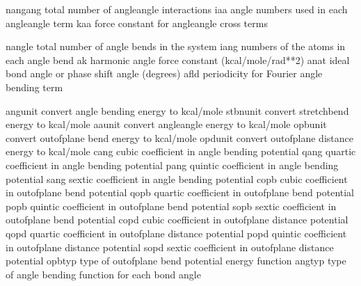 \documentclass[letterpaper,11pt,english]{sphinxmanual}
\begin{document}

\begin{sphinxVerbatim}[commandchars=\\\{\}]
nangang         total number of angle\PYGZhy{}angle interactions
iaa             angle numbers used in each angle\PYGZhy{}angle term
kaa             force constant for angle\PYGZhy{}angle cross terms
\end{sphinxVerbatim}


\begin{sphinxVerbatim}[commandchars=\\\{\}]
nangle          total number of angle bends in the system
iang            numbers of the atoms in each angle bend
ak              harmonic angle force constant (kcal/mole/rad**2)
anat            ideal bond angle or phase shift angle (degrees)
afld            periodicity for Fourier angle bending term
\end{sphinxVerbatim}


\begin{sphinxVerbatim}[commandchars=\\\{\}]
angunit         convert angle bending energy to kcal/mole
stbnunit        convert stretch\PYGZhy{}bend energy to kcal/mole
aaunit          convert angle\PYGZhy{}angle energy to kcal/mole
opbunit         convert out\PYGZhy{}of\PYGZhy{}plane bend energy to kcal/mole
opdunit         convert out\PYGZhy{}of\PYGZhy{}plane distance energy to kcal/mole
cang            cubic coefficient in angle bending potential
qang            quartic coefficient in angle bending potential
pang            quintic coefficient in angle bending potential
sang            sextic coefficient in angle bending potential
copb            cubic coefficient in out\PYGZhy{}of\PYGZhy{}plane bend potential
qopb            quartic coefficient in out\PYGZhy{}of\PYGZhy{}plane bend potential
popb            quintic coefficient in out\PYGZhy{}of\PYGZhy{}plane bend potential
sopb            sextic coefficient in out\PYGZhy{}of\PYGZhy{}plane bend potential
copd            cubic coefficient in out\PYGZhy{}of\PYGZhy{}plane distance potential
qopd            quartic coefficient in out\PYGZhy{}of\PYGZhy{}plane distance potential
popd            quintic coefficient in out\PYGZhy{}of\PYGZhy{}plane distance potential
sopd            sextic coefficient in out\PYGZhy{}of\PYGZhy{}plane distance potential
opbtyp          type of out\PYGZhy{}of\PYGZhy{}plane bend potential energy function
angtyp          type of angle bending function for each bond angle
\end{sphinxVerbatim}
\end{document}
